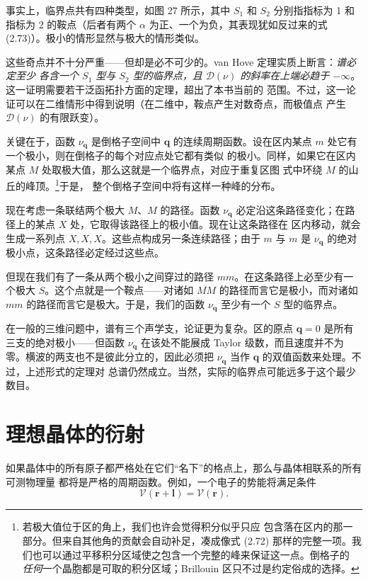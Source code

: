 事实上，临界点共有四种类型，如图 27 所示，其中 $S_1$ 和 $S_2$
分别指指标为 1 和指标为 2 的鞍点（后者有两个 $\alpha$
为正、一个为负，其表现犹如反过来的式 (2.73)）。极小的情形显然与极大的情形类似。

这些奇点并不十分严重——但却是必不可少的。van Hove 定理实质上断言：\emph{谱必定至少
各含一个 $S_1$ 型与 $S_2$ 型的临界点，且 $\mathcal{D}(\nu)$
的斜率在上端必趋于 $-\infty$}。这一证明需要若干泛函拓扑方面的定理，超出了本书当前的
范围。不过，这一论证可以在二维情形中得到说明（在二维中，鞍点产生对数奇点，而极值点
产生 $\mathcal{D}(\nu)$ 的有限跃变）。

关键在于，函数 $\nu_{\mathbf{q}}$ 是倒格子空间中 $\mathbf{q}$
的连续周期函数。设在区内某点 $m$ 处它有一个极小，则在倒格子的每个对应点处它都有类似
的极小。同样，如果它在区内某点 $M$ 处取极大值，那么这就是一个临界点，对应于重复区图
式中环绕 $M$ 的山丘的峰顶。\footnote{若极大值位于区的角上，我们也许会觉得积分似乎只应
包含落在区内的那一部分。但来自其他角的贡献会自动补足，凑成像式 (2.72)
那样的完整一项。我们也可以通过平移积分区域使之包含一个完整的峰来保证这一点。倒格子的
\emph{任何}一个晶胞都是可取的积分区域；Brillouin 区只不过是约定俗成的选择。}于是，
整个倒格子空间中将有这样一种峰的分布。

现在考虑一条联结两个极大 $M$、$M$ 的路径。函数 $\nu_{\mathbf{q}}$
必定沿这条路径变化；在路径上的某点 $X$ 处，它取得该路径上的极小值。现在让这条路径在
区内移动，就会生成一系列点 $X, X, X$。这些点构成另一条连续路径；由于 $m$ 与 $m$
是 $\nu_{\mathbf{q}}$ 的绝对极小点，这条路径必定经过这些点。

但现在我们有了一条从两个极小之间穿过的路径 $mm$。在这条路径上必至少有一个极大
$S$。这个点就是一个鞍点——对诸如 $MM$ 的路径而言它是极小，而对诸如 $mm$
的路径而言它是极大。于是，我们的函数 $\nu_{\mathbf{q}}$ 至少有一个 $S$
型的临界点。

在一般的三维问题中，谱有三个声学支，论证更为复杂。区的原点 $\mathbf{q} = 0$
是所有三支的绝对极小——但函数 $\nu_{\mathbf{q}}$ 在该处不能展成 Taylor
级数，而且速度并不为零。横波的两支也不是彼此分立的，因此必须把
$\nu_{\mathbf{q}}$ 当作 $\mathbf{q}$ 的双值函数来处理。不过，上述形式的定理对
总谱仍然成立。当然，实际的临界点可能远多于这个最少数目。

\section{理想晶体的衍射}

如果晶体中的所有原子都严格处在它们“名下”的格点上，那么与晶体相联系的所有可测物理量
都将是严格的周期函数。例如，一个电子的势能将满足条件
\begin{equation*}
\mathcal{V}(\mathbf{r} + \mathbf{l}) = \mathcal{V}(\mathbf{r}).
\tag{2.74}
\end{equation*}

